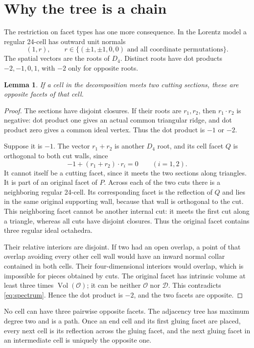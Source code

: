 \documentclass[11pt]{article}
\newtheorem{lemma}[theorem]{Lemma}
\theoremstyle{remark}
\newcommand{\Vol}{\operatorname{Vol}}
\newcommand{\OCT}{\mathcal O}
\newcommand{\DBL}{\mathcal D}
\begin{document}
\section{Why the tree is a chain}

The restriction on facet types has one more consequence. In the
Lorentz model a regular 24-cell has outward unit normals
\[
 (1,r),\qquad
 r\in\{(\pm1,\pm1,0,0)\text{ and all coordinate permutations}\}.
\]
The spatial vectors are the roots of $D_4$. Distinct roots have
dot products $-2,-1,0,1$, with $-2$ only for opposite roots.

\begin{lemma}\label{lem:opposite}
If a cell in the decomposition meets two cutting sections,
these are opposite facets of that cell.
\end{lemma}
\begin{proof}
The sections have disjoint closures. If their roots are $r_1,r_2$,
then $r_1\cdot r_2$ is negative: dot product one gives an actual
common triangular ridge, and dot product zero gives a common
ideal vertex. Thus the dot product is $-1$ or $-2$.

Suppose it is $-1$. The vector $r_1+r_2$ is another $D_4$ root,
and its cell facet $Q$ is orthogonal to both cut walls, since
\[
 -1+(r_1+r_2)\cdot r_i=0\qquad(i=1,2).
\]
It cannot itself be a cutting facet, since it meets the two
sections along triangles. It is part of an original facet of $P$.
Across each of the two cuts there is a neighboring regular
24-cell. Its corresponding facet is the reflection of $Q$ and
lies in the same original supporting wall, because that wall is
orthogonal to the cut. This neighboring facet cannot be another
internal cut: it meets the first cut along a triangle, whereas
all cuts have disjoint closures. Thus the original facet contains
three regular ideal octahedra.

Their relative interiors are disjoint. If two had an open
overlap, a point of that overlap avoiding every other cell wall
would have an inward normal collar contained in both cells.
Their four-dimensional interiors would overlap, which is
impossible for pieces obtained by cuts. The original facet has
intrinsic volume at least three times $\Vol(\OCT)$; it can be
neither $\OCT$ nor $\DBL$. This contradicts
\eqref{eq:spectrum}. Hence the dot product is $-2$, and the two
facets are opposite.
\end{proof}

No cell can have three pairwise opposite facets. The adjacency
tree has maximum degree two and is a path. Once an end cell and
its first gluing facet are placed, every next cell is its
reflection across the gluing facet, and the next gluing facet in
an intermediate cell is uniquely the opposite one.
\end{document}
